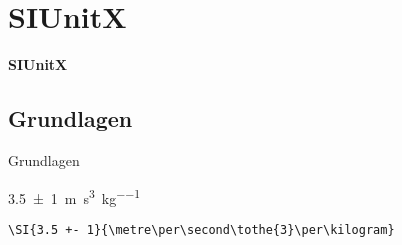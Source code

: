\section{SIUnitX}
\begin{frame}[c]
	\begin{center}
		\LARGE \textbf{SIUnitX}
	\end{center}
\end{frame}
\subsection{Grundlagen}
\begin{frame}[c]
	\begin{center}
		\large Grundlagen
	\end{center}
\end{frame}
\begin{frame}[fragile]
	\Ausgabe
	\begin{outputbox}
		\SI{3.5 +- 1}{\metre\per\second\cubed\per\kilogram}
	\end{outputbox}

	\pause\Code
	\begin{lstlisting}
\SI{3.5 +- 1}{\metre\per\second\tothe{3}\per\kilogram}
	\end{lstlisting}
\end{frame}
